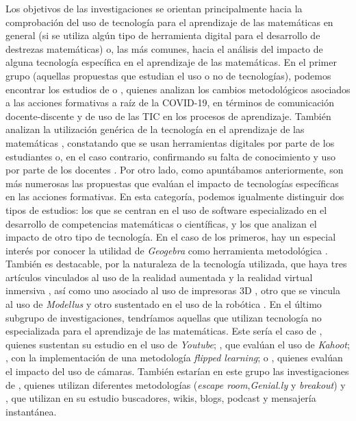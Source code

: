 \documentclass[spanish]{textolivre}
\begin{document}
Los objetivos de las investigaciones se orientan principalmente hacia la comprobación del uso de tecnología para el aprendizaje de las matemáticas en general (si se utiliza algún tipo de herramienta digital para el desarrollo de destrezas matemáticas) o, las más comunes, hacia el análisis del impacto de alguna tecnología específica en el aprendizaje de las matemáticas. En el primer grupo (aquellas propuestas que estudian el uso o no de tecnologías), podemos encontrar los estudios de \textcite{hossein-mohand_uses_2021} o \textcite{iglesias_aprendizaje_2020}, quienes analizan los cambios metodológicos asociados a las acciones formativas a raíz de la COVID-19, en términos de comunicación docente-discente y de uso de las TIC en los procesos de aprendizaje. También analizan la utilización genérica de la tecnología en el aprendizaje de las matemáticas \textcite{gomez-garcia_technological_2020,benitez__effects_2019}, constatando que se usan herramientas digitales por parte de los estudiantes o, en el caso contrario, confirmando su falta de conocimiento y uso por parte de los docentes \cite{nunes_fatores_2020}. Por otro lado, como apuntábamos anteriormente, son más numerosas las propuestas que evalúan el impacto de tecnologías específicas en las acciones formativas. En esta categoría, podemos igualmente distinguir dos tipos de estudios: los que se centran en el uso de software especializado en el desarrollo de competencias matemáticas o científicas, y los que analizan el impacto de otro tipo de tecnología. En el caso de los primeros, hay un especial interés por conocer la utilidad de \textit{Geogebra} como herramienta metodológica \cite{del_cerro_application_2021,weinhandl_real-world_2021,weinhandl_look_2021}. También es destacable, por la naturaleza de la tecnología utilizada, que haya tres artículos vinculados al uso de la realidad aumentada \cite{jesionkowska_active_2020,petrov_effect_2020} y la realidad virtual inmersiva \cite{silva-diaz_uso_2021}, así como uno asociado al uso de impresoras 3D \cite{beltran_modelado_2017}, otro que se vincula al uso de \textit{Modellus} \cite{nunes_fatores_2020} y otro sustentado en el uso de la robótica \cite{aris_educational_2019}. En el último subgrupo de investigaciones, tendríamos aquellas que utilizan tecnología no especializada para el aprendizaje de las matemáticas. Este sería el caso de \textcite{gil-quintana_learning_2020}, quienes sustentan su estudio en el uso de \textit{Youtube}; \textcite{curto__student_2019}, que evalúan el uso de \textit{Kahoot}; \textcite{lopez_formative_2019}, con la implementación de una metodología \textit{flipped learning}; o \textcite{altanis_systematic_2018}, quienes evalúan el impacto del uso de cámaras. También estarían en este grupo las investigaciones de \textcite{jimenez_digital_2020}, quienes utilizan diferentes metodologías (\textit{escape room},\textit{Genial.ly} y \textit{breakout}) y \textcite{garcia-martin_use_2019}, que utilizan en su estudio buscadores, wikis, blogs, podcast y mensajería instantánea.
\end{document}
